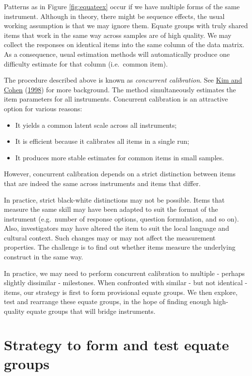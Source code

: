 \documentclass[
]{book}
\providecommand{\tightlist}{%
  \setlength{\itemsep}{0pt}\setlength{\parskip}{0pt}}
\begin{document}
Patterns as in Figure \ref{fig:equateex} occur if we have multiple forms of the same instrument. Although in theory, there might be sequence effects, the usual working assumption is that we may ignore them. Equate groups with truly shared items that work in the same way across samples are of high quality. We may collect the responses on identical items into the same column of the data matrix. As a consequence, usual estimation methods will automatically produce one difficulty estimate for that column (i.e.~common item).

The procedure described above is known as \emph{concurrent calibration}. See \protect\hyperlink{ref-kim1998}{Kim and Cohen} (\protect\hyperlink{ref-kim1998}{1998}) for more background. The method simultaneously estimates the item parameters for all instruments. Concurrent calibration is an attractive option for various reasons:

\begin{itemize}
\tightlist
\item
  It yields a common latent scale across all instruments;
\item
  It is efficient because it calibrates all items in a single run;
\item
  It produces more stable estimates for common items in small samples.
\end{itemize}

However, concurrent calibration depends on a strict distinction between items that are indeed the same across instruments and items that differ.

In practice, strict black-white distinctions may not be possible. Items that measure the same skill may have been adapted to suit the format of the instrument (e.g.~number of response options, question formulation, and so on). Also, investigators may have altered the item to suit the local language and cultural context. Such changes may or may not affect the measurement properties. The challenge is to find out whether items measure the underlying construct in the same way.

In practice, we may need to perform concurrent calibration to multiple - perhaps slightly dissimilar - milestones. When confronted with similar - but not identical - items, our strategy is first to form provisional equate groups. We then explore, test and rearrange these equate groups, in the hope of finding enough high-quality equate groups that will bridge instruments.

\hypertarget{sec:equaterules}{%
\section{Strategy to form and test equate groups}\label{sec:equaterules}}
\end{document}
